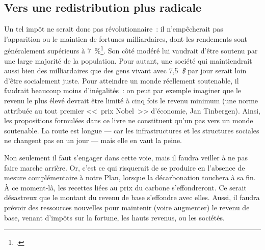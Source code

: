 \documentclass[a5paper,french,openany]{memoir}
\begin{document}
\subsection{Vers une redistribution plus radicale}
Un tel impôt ne serait donc pas révolutionnaire~: il n'empêcherait pas l'apparition ou le maintien de fortunes milliardaires, dont les rendements sont généralement supérieurs à 7~\%\footnote{\cite{chancel_world_2022}.}. 
Son côté modéré lui vaudrait d'être soutenu par une large majorité de la population. Pour autant, une société qui maintiendrait aussi bien des milliardaires que des gens vivant avec 7,5~\textit{\$} par jour serait loin d'être socialement juste. Pour atteindre un monde réellement soutenable, il faudrait beaucoup moins d'inégalités~: %
on peut par exemple imaginer que le revenu le plus élevé devrait être limité à cinq fois le revenu minimum (une norme attribuée au tout premier <<~prix Nobel~>> d'économie, Jan Tinbergen). Ainsi, les propositions formulées dans ce livre ne constituent qu'un pas vers un monde soutenable. La route est longue --- car les infrastructures et les structures sociales ne changent pas en un jour --- mais elle en vaut la peine.  

Non seulement il faut s'engager dans cette voie, mais il faudra veiller à ne pas faire marche arrière. Or, c'est ce qui risquerait de se produire en l'absence de mesure complémentaire à notre Plan, lorsque la décarbonation touchera à sa fin. %
À ce moment-là, les recettes liées au prix du carbone s'effondreront. Ce serait désastreux que le montant du revenu de base s'effondre avec elles. Aussi, il faudra prévoir des ressources nouvelles pour maintenir (voire augmenter) le revenu de base, 
venant d'impôts sur la fortune, les hauts revenus, ou les sociétés. 
\end{document}
